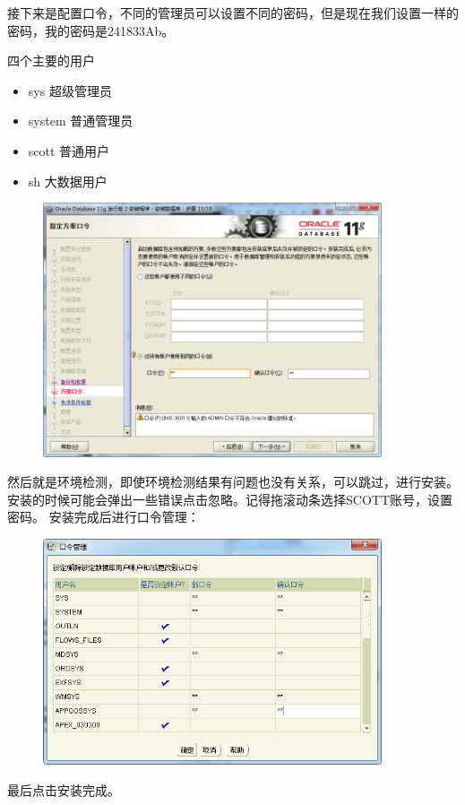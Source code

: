 \documentclass[a4paper,12pt]{ctexart}
\begin{document}
接下来是配置口令，不同的管理员可以设置不同的密码，但是现在我们设置一样的密码，我的密码是241833Ab。

四个主要的用户
\begin{itemize}
  \item sys 超级管理员
  \item system 普通管理员
  \item scott 普通用户
  \item sh 大数据用户
\end{itemize}

\begin{figure}[H]
  \centering
  \includegraphics[width=10cm]{oracle/安装步骤_指定配置_配置口令.png}
\end{figure}

然后就是环境检测，即使环境检测结果有问题也没有关系，可以跳过，进行安装。安装的时候可能会弹出一些错误点击忽略。记得拖滚动条选择SCOTT账号，设置密码。
安装完成后进行口令管理：
\begin{figure}[H]
  \centering
  \includegraphics[width=10cm]{oracle/口令管理.png}
\end{figure}
最后点击安装完成。
\end{document}
